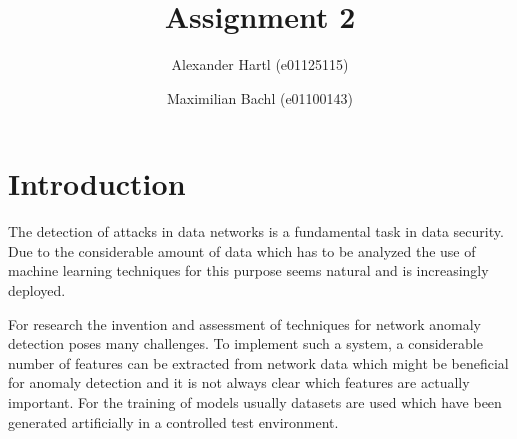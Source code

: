 \documentclass[sigconf,nonacm]{acmart}
\begin{document}
\title{Assignment 2}

\author{Alexander Hartl (e01125115)}

\author{Maximilian Bachl (e01100143)}
\authornotemark[1]

\renewcommand{\shortauthors}{Hartl and Bachl}


\maketitle

\section{Introduction}
The detection of attacks in data networks is a fundamental task in data security. Due to the considerable amount of data which has to be analyzed the use of machine learning techniques for this purpose seems natural and is increasingly deployed.

For research the invention and assessment of techniques for network anomaly detection poses many challenges. To implement such a system, a considerable number of features can be extracted from network data which might be beneficial for anomaly detection and it is not always clear which features are actually important. For the training of models usually datasets are used which have been generated artificially in a controlled test environment. 
\end{document}
